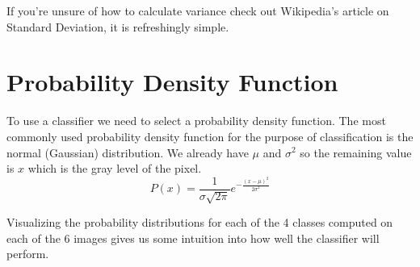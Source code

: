\documentclass[12pt,a4paper]{report}
\begin{document}
If you're unsure of how to calculate variance check out Wikipedia's article on Standard Deviation, it is refreshingly simple.

\section{Probability Density Function}
To use a classifier we need to select a probability density function. The most commonly used probability density function for the purpose of classification is the normal (Gaussian) distribution. We already have $\mu$ and $\sigma^2$ so the remaining value is $x$ which is the gray level of the pixel.
\begin{equation}
	P(x) = \frac{1}{\sigma\sqrt{2\pi}}e^{-\frac{(x - \mu)^2}{2\sigma^2}}
\end{equation}

Visualizing the probability distributions for each of the 4 classes computed on each of the 6 images gives us some intuition into how well the classifier will perform.
\end{document}
